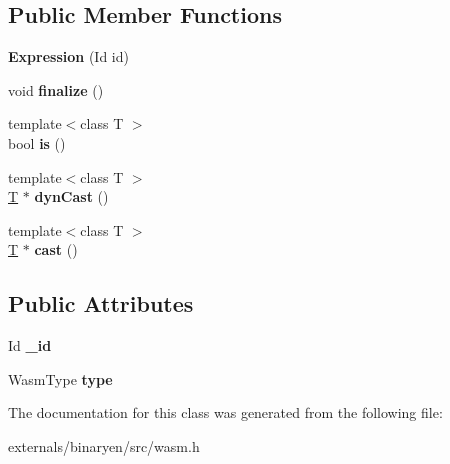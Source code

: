 \subsection*{Public Member Functions}
\begin{DoxyCompactItemize}
\item 
\mbox{\label{classwasm_1_1_expression_ab4a4d8fdfc938fc7ab3eb675628bba6a}} 
{\bfseries Expression} (Id id)
\item 
\mbox{\label{classwasm_1_1_expression_a113d8dc487c9cf73bc2832f58eaab1a8}} 
void {\bfseries finalize} ()
\item 
\mbox{\label{classwasm_1_1_expression_a14645482a5f187fc79869ae4f40c0d66}} 
{\footnotesize template$<$class T $>$ }\\bool {\bfseries is} ()
\item 
\mbox{\label{classwasm_1_1_expression_af8b63bf358cf63877d636940373b2985}} 
{\footnotesize template$<$class T $>$ }\\\mbox{\hyperlink{struct_t}{T}} $\ast$ {\bfseries dyn\+Cast} ()
\item 
\mbox{\label{classwasm_1_1_expression_af2d896a6eee6c7c5a66653d4f6865db2}} 
{\footnotesize template$<$class T $>$ }\\\mbox{\hyperlink{struct_t}{T}} $\ast$ {\bfseries cast} ()
\end{DoxyCompactItemize}
\subsection*{Public Attributes}
\begin{DoxyCompactItemize}
\item 
\mbox{\label{classwasm_1_1_expression_ab2b1595216f4eed28a1533dd2cfc1774}} 
Id {\bfseries \+\_\+id}
\item 
\mbox{\label{classwasm_1_1_expression_ade666f88da021232f6bf765bb2c30f75}} 
Wasm\+Type {\bfseries type}
\end{DoxyCompactItemize}


The documentation for this class was generated from the following file\+:\begin{DoxyCompactItemize}
\item 
externals/binaryen/src/wasm.\+h\end{DoxyCompactItemize}
